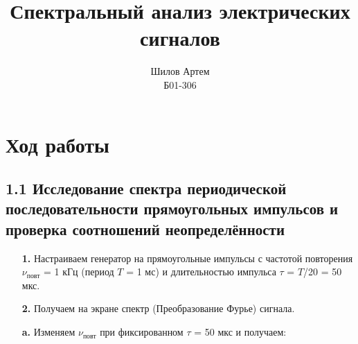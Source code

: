\documentclass[a4paper,12pt]{article}
\title{Спектральный анализ электрических сигналов}
\author{Шилов Артем\\
Б01-306}
\theoremstyle{definition}
\begin{document}
	
\maketitle

\section{Ход работы}

\subsection*{1.1 Исследование спектра периодической последовательности
прямоугольных импульсов и проверка соотношений неопределённости}

\begin{enumerate}

\item [\textbf{1.}]  Настраиваем генератор на прямоугольные импульсы с частотой повторения $\nu_\text{повт}$ = 1 кГц (период $T$ = 1 мс) и
длительностью импульса $\tau$ = $T$/20 = 50 мкс.

\item [\textbf{2.}] Получаем на экране спектр (Преобразование Фурье) сигнала.

\textbf{a.} Изменяем $\nu_\text{повт}$ при фиксированном $\tau$ = 50 мкс и получаем:


\end{enumerate}
\end{document}
